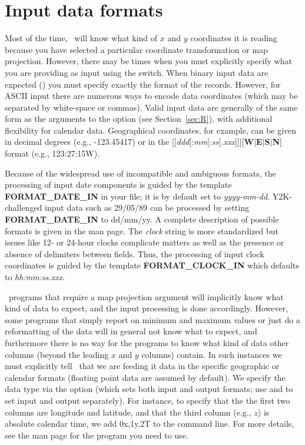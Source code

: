 \section{Input data formats}
\label{sec:input data}

Most of the time, \GMT\ will know what kind of $x$ and $y$ coordinates it is reading because you have selected
a particular coordinate transformation or map projection.  However,
there may be times when you must explicitly specify what you are
providing as input using the  switch. When binary input data are expected () you must
specify exactly the format of the records.  However, for ASCII input there are numerous
ways to encode data coordinates (which may be separated by white-space or commas).  Valid input data are generally
of the same form as the arguments to the  option (see Section~\ref{sec:R}), with additional
flexibility for calendar data.  Geographical coordinates, for example, can be given in decimal degrees
(e.g., -123.45417) or in the
[\PM]\emph{ddd}[:\emph{mm}[:\emph{ss}[\emph{.xxx}]]][\textbf{W}$|$\textbf{E}$|$\textbf{S}$|$\textbf{N}]
format (e.g., 123:27:15W).

Because of the widespread use of incompatible and ambiguous formats, the processing of input
date components is guided by the template \textbf{FORMAT\_DATE\_IN} in your
 file; it is by default set to \emph{yyyy-mm-dd}.  Y2K-challenged input data such as
29/05/89 can be processed by setting \textbf{FORMAT\_DATE\_IN}
to dd/mm/yy.  A complete description of possible formats is given in the 
man page.  The \emph{clock} string is more standardized but issues like 12- or 24-hour clocks complicate matters
as well as the presence or absence of delimiters between fields.  Thus, the processing of input
clock coordinates is guided by the template \textbf{FORMAT\_CLOCK\_IN} which defaults to \emph{hh:mm:ss.xxx}.

\GMT\ programs that require a map projection argument will implicitly know what kind of data to expect, and the
input processing is done accordingly.  However, some programs that simply report on minimum and maximum
values or just do a reformatting of the data will in general not know what to expect, and furthermore there is
no way for the programs to know what kind of data other columns (beyond the leading $x$ and $y$ columns) contain.
In such instances we must
explicitly tell \GMT\ that we are feeding it data in the specific geographic or calendar formats (floating point
data are assumed by default).  We specify the data type via the  option (which sets both input and output
formats; use  and  to set input and output separately).  For instance, to specify that the
the first two columns are longitude and latitude, and that the third column (e.g., $z$) is absolute calendar time, we add
0x,1y,2T to the command line.  For more details, see the man page for the program you need to use.

